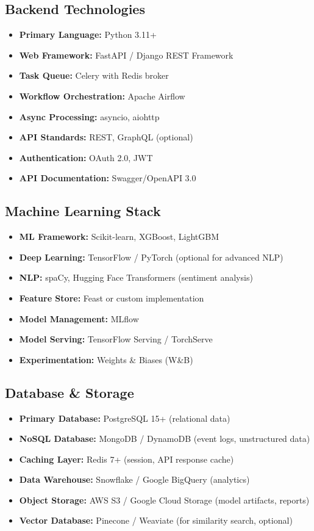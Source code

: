 \documentclass[12pt,a4paper]{article}
\begin{document}
\subsection{Backend Technologies}
\begin{itemize}
    \item \textbf{Primary Language:} Python 3.11+
    \item \textbf{Web Framework:} FastAPI / Django REST Framework
    \item \textbf{Task Queue:} Celery with Redis broker
    \item \textbf{Workflow Orchestration:} Apache Airflow
    \item \textbf{Async Processing:} asyncio, aiohttp
    \item \textbf{API Standards:} REST, GraphQL (optional)
    \item \textbf{Authentication:} OAuth 2.0, JWT
    \item \textbf{API Documentation:} Swagger/OpenAPI 3.0
\end{itemize}

\subsection{Machine Learning Stack}
\begin{itemize}
    \item \textbf{ML Framework:} Scikit-learn, XGBoost, LightGBM
    \item \textbf{Deep Learning:} TensorFlow / PyTorch (optional for advanced NLP)
    \item \textbf{NLP:} spaCy, Hugging Face Transformers (sentiment analysis)
    \item \textbf{Feature Store:} Feast or custom implementation
    \item \textbf{Model Management:} MLflow
    \item \textbf{Model Serving:} TensorFlow Serving / TorchServe
    \item \textbf{Experimentation:} Weights \& Biases (W\&B)
\end{itemize}

\subsection{Database \& Storage}
\begin{itemize}
    \item \textbf{Primary Database:} PostgreSQL 15+ (relational data)
    \item \textbf{NoSQL Database:} MongoDB / DynamoDB (event logs, unstructured data)
    \item \textbf{Caching Layer:} Redis 7+ (session, API response cache)
    \item \textbf{Data Warehouse:} Snowflake / Google BigQuery (analytics)
    \item \textbf{Object Storage:} AWS S3 / Google Cloud Storage (model artifacts, reports)
    \item \textbf{Vector Database:} Pinecone / Weaviate (for similarity search, optional)
\end{itemize}
\end{document}
